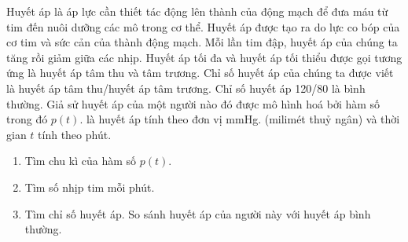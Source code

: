 \begin{bt}%
    Huyết áp là áp lực cần thiết tác động lên thành của động mạch để đưa máu từ tim đến nuôi dưỡng các mô trong cơ thể. Huyết áp được tạo ra do lực co bóp của cơ tim và sức cản của thành động mạch. Mỗi lần tim đập, huyết áp của chúng ta tăng rồi giảm giữa các nhịp. Huyết áp tối đa và huyết áp tối thiểu được gọi tương ứng là huyết áp tâm thu và tâm trương. Chỉ số huyết áp của chúng ta được viết là huyết áp tâm thu/huyết áp tâm trương. Chỉ số huyết áp 120/80 là bình thường. Giả sử huyết áp của một người nào đó được mô hình hoá bởi hàm số
    trong đó $p(t)$. là huyết áp tính theo đơn vị mmHg. (milimét thuỷ ngân) và thời gian $t$ tính theo phút.
    \begin{enumerate}
        \item Tìm chu kì của hàm số $p(t)$.
        \item Tìm số nhịp tim mỗi phút.
        \item Tìm chỉ số huyết áp. So sánh huyết áp của người này với huyết áp bình thường.
    \end{enumerate}
\end{bt}

